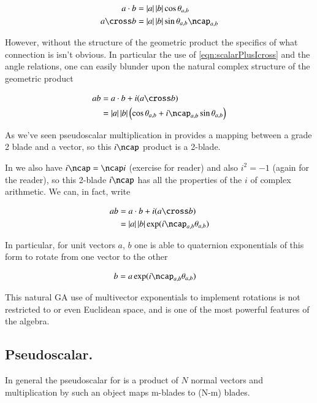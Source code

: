 \begin{align*}
a \cdot b &= \Abs{a}\Abs{b} \cos\theta_{a,b} \\
a \cross b &= \Abs{a}\Abs{b} \sin\theta_{a,b} \ncap_{a,b}
\end{align*}

However, without the structure of the geometric product the specifics of what 
connection is isn't obvious.  In particular the use of \ref{eqn:scalarPlusIcross} and the angle relations, one can easily
blunder upon the natural complex structure of the geometric product

\begin{align*}
a b 
&= a \cdot b + i (a \cross b) \\
&=
\Abs{a}\Abs{b} \left( \cos\theta_{a,b} + i\ncap_{a,b} \sin\theta_{a,b} \right) \\
\end{align*}

As we've seen pseudoscalar multiplication in  provides a mapping between a grade 2 blade and a vector, so 
this $i\ncap$ product is a 2-blade.

In  we also have $i \ncap = \ncap i$ (exercise for reader) and also $i^2 = -1$ (again for the reader), so this 
2-blade $i\ncap$ has all the properties of the $i$ of complex arithmetic.  We can, in fact, write

\begin{align*}
a b 
&= a \cdot b + i (a \cross b) \\
&=
\Abs{a}\Abs{b} \exp( i\ncap_{a,b} \theta_{a,b} )
\end{align*}

In particular, for unit vectors $a$, $b$ one is able to quaternion exponentials of this form to rotate from one vector to the other

\begin{align*}
b &= a \exp( i\ncap_{a,b} \theta_{a,b} )
\end{align*}

This natural GA use
of multivector exponentials to implement rotations is not restricted to  or even Euclidean space, and is one of the most
powerful features of the algebra.

\subsection{ Pseudoscalar. }

In general the
pseudoscalar for  is a product of $N$ normal vectors and multiplication by such an object maps m-blades to (N-m) blades.

